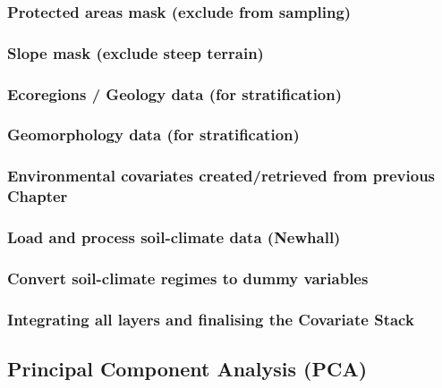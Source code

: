 \documentclass[
  10pt,
  b5paper,
  oneside]{book}
\begin{document}
\subsubsection{Protected areas mask (exclude from sampling)}\label{protected-areas-mask-exclude-from-sampling}

\subsubsection{Slope mask (exclude steep terrain)}\label{slope-mask-exclude-steep-terrain}

\subsubsection{Ecoregions / Geology data (for stratification)}\label{ecoregions-geology-data-for-stratification}

\subsubsection{Geomorphology data (for stratification)}\label{geomorphology-data-for-stratification}

\subsubsection{Environmental covariates created/retrieved from previous Chapter}\label{environmental-covariates-createdretrieved-from-previous-chapter}

\subsubsection{Load and process soil-climate data (Newhall)}\label{load-and-process-soil-climate-data-newhall}

\subsubsection{Convert soil-climate regimes to dummy variables}\label{convert-soil-climate-regimes-to-dummy-variables}

\subsubsection{Integrating all layers and finalising the Covariate Stack}\label{integrating-all-layers-and-finalising-the-covariate-stack}

\subsection{Principal Component Analysis (PCA)}\label{pca}
\end{document}
